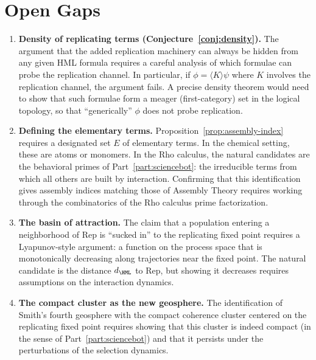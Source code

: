\chapter{Open Gaps}
\label{sec:origins-gaps}

\begin{enumerate}[label=\textbf{Gap \arabic*.}, leftmargin=*, itemsep=8pt]

  \item \textbf{Density of replicating terms
        (Conjecture~\ref{conj:density}).}
        The argument that the added replication machinery can always
        be hidden from any given HML formula requires a careful
        analysis of which formulae can probe the replication channel.
        In particular, if $\phi = \langle K \rangle \psi$ where $K$
        involves the replication channel, the argument fails.
        A precise density theorem would need to show that such
        formulae form a meager (first-category) set in the logical
        topology, so that ``generically'' $\phi$ does not probe
        replication.

  \item \textbf{Defining the elementary terms.}
        Proposition~\ref{prop:assembly-index} requires a designated
        set $E$ of elementary terms.
        In the chemical setting, these are atoms or monomers.
        In the Rho calculus, the natural candidates are the
        behavioral primes of Part~\ref{part:sciencebot}: the irreducible
        terms from which all others are built by interaction.
        Confirming that this identification gives assembly indices
        matching those of Assembly Theory requires working through
        the combinatorics of the Rho calculus prime factorization.

  \item \textbf{The basin of attraction.}
        The claim that a population entering a neighborhood of
        $\mathrm{Rep}$ is ``sucked in'' to the replicating fixed
        point requires a Lyapunov-style argument: a function on the
        process space that is monotonically decreasing along
        trajectories near the fixed point.
        The natural candidate is the distance $d_{\HML}$ to
        $\mathrm{Rep}$, but showing it decreases requires
        assumptions on the interaction dynamics.

  \item \textbf{The compact cluster as the new geosphere.}
        The identification of Smith's fourth geosphere with the
        compact coherence cluster centered on the replicating fixed
        point requires showing that this cluster is indeed compact
        (in the sense of Part~\ref{part:sciencebot}) and that it persists under the
        perturbations of the selection dynamics.


\end{enumerate}
